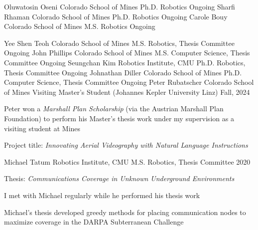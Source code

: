 

\begin{cventries}
  \cventry
  {Oluwatosin Oseni}
  {Colorado School of Mines}
  {Ph.D. Robotics}
  {Ongoing}
  {
  }
  \cventry
  {Sharfi Rhaman}
  {Colorado School of Mines}
  {Ph.D. Robotics}
  {Ongoing}
  {
  }
  \cventry
  {Carole Bouy}
  {Colorado School of Mines}
  {M.S. Robotics}
  {Ongoing}
  {
  }
\end{cventries}

\begin{cventries}
  \cventry
  {Yee Shen Teoh}
  {Colorado School of Mines}
  {M.S. Robotics, Thesis Committee}
  {Ongoing}
  {
  }
  \cventry
  {John Phillips}
  {Colorado School of Mines}
  {M.S. Computer Science, Thesis Committee}
  {Ongoing}
  {
  }
  \cventry
  {Seungchan Kim}
  {Robotics Institute, CMU}
  {Ph.D. Robotics, Thesis Committee}
  {Ongoing}
  {
  }
  \cventry
  {Johnathan Diller}
  {Colorado School of Mines}
  {Ph.D. Computer Science, Thesis Committee}
  {Ongoing}
  {
  }
  \cventry
  {Peter Rubatscher}
  {Colorado School of Mines}
  {Visiting Master's Student (Johannes Kepler University Linz)}
  {Fall, 2024}
  {
    \begin{cvitems}
      \item Peter won a \emph{Marshall Plan Scholarship}
        (via the Austrian Marshall Plan Foundation)
        to perform his Master's thesis work under my supervision as a visiting
        student at Mines
      \item Project title: \emph{Innovating Aerial Videography
        with Natural Language Instructions}
    \end{cvitems}
  }
  \cventry
  {Michael Tatum}
  {Robotics Institute, CMU}
  {M.S. Robotics, Thesis Committee}
  {2020}
  {
    \begin{cvitems}
      \item Thesis: \emph{Communications Coverage in Unknown Underground Environments}
      \item I met with Michael regularly while he performed his thesis work
      \item Michael's thesis developed greedy methods for placing communication
        nodes to maximize coverage in the DARPA Subterranean Challenge
    \end{cvitems}
  }
\end{cventries}

